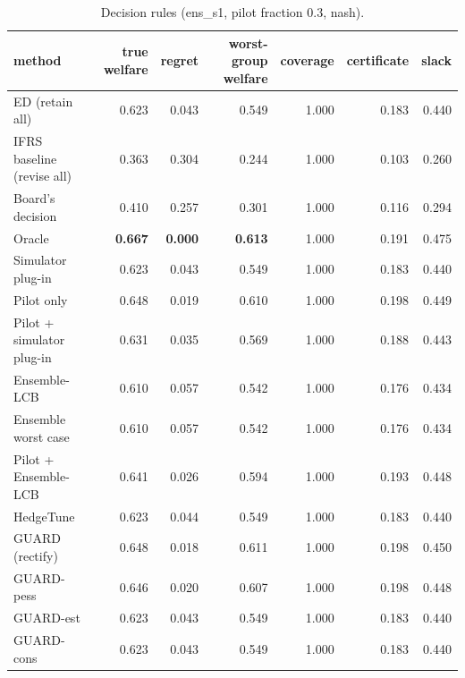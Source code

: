 \begin{table}[t]
\centering
\small
\begin{tabular}{lrrrrrr}
\toprule
method & true welfare & regret & worst-group welfare & coverage & certificate & slack \\
\midrule
ED (retain all) & 0.623 & 0.043 & 0.549 & 1.000 & 0.183 & 0.440 \\
IFRS baseline (revise all) & 0.363 & 0.304 & 0.244 & 1.000 & 0.103 & 0.260 \\
Board's decision & 0.410 & 0.257 & 0.301 & 1.000 & 0.116 & 0.294 \\
Oracle & \textbf{0.667} & \textbf{0.000} & \textbf{0.613} & 1.000 & 0.191 & 0.475 \\
Simulator plug-in & 0.623 & 0.043 & 0.549 & 1.000 & 0.183 & 0.440 \\
Pilot only & 0.648 & 0.019 & 0.610 & 1.000 & 0.198 & 0.449 \\
Pilot + simulator plug-in & 0.631 & 0.035 & 0.569 & 1.000 & 0.188 & 0.443 \\
Ensemble-LCB & 0.610 & 0.057 & 0.542 & 1.000 & 0.176 & 0.434 \\
Ensemble worst case & 0.610 & 0.057 & 0.542 & 1.000 & 0.176 & 0.434 \\
Pilot + Ensemble-LCB & 0.641 & 0.026 & 0.594 & 1.000 & 0.193 & 0.448 \\
HedgeTune & 0.623 & 0.044 & 0.549 & 1.000 & 0.183 & 0.440 \\
GUARD (rectify) & 0.648 & 0.018 & 0.611 & 1.000 & 0.198 & 0.450 \\
GUARD-pess & 0.646 & 0.020 & 0.607 & 1.000 & 0.198 & 0.448 \\
GUARD-est & 0.623 & 0.043 & 0.549 & 1.000 & 0.183 & 0.440 \\
GUARD-cons & 0.623 & 0.043 & 0.549 & 1.000 & 0.183 & 0.440 \\
\bottomrule
\end{tabular}
\caption{Decision rules (ens\_s1, pilot fraction 0.3, nash).}
\label{tab:methods-nash}
\end{table}
